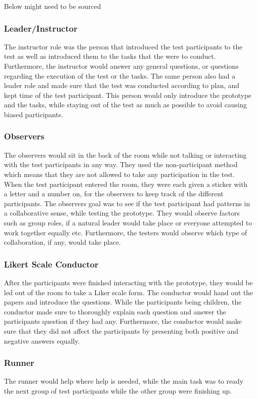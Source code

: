 Below might need to be sourced

\subsubsection*{Leader/Instructor}
The instructor role was the person that introduced the test participants to the test as well as introduced them to the tasks that the were to conduct. Furthermore, the instructor would answer any general questions, or questions regarding the execution of the test or the tasks. The same person also had a leader role and made sure that the test was conducted according to plan, and kept time of the test participant. This person would only introduce the prototype and the tasks, while staying out of the test as much as possible to avoid causing biased participants.

\subsubsection*{Observers}
The observers would sit in the back of the room while not talking or interacting with the test participants in any way. They used the non-participant method which means that they are not allowed to take any participation in the test. When the test participant entered the room, they were each given a sticker with a letter and a number on, for the observers to keep track of the different participants. The observers goal was to see if the test participant had patterns in a collaborative sense, while testing the prototype. They would observe factors such as group roles, if a natural leader would take place or everyone attempted to work together equally etc. Furthermore, the testers would observe which type of collaboration, if any, would take place. 

\subsubsection*{Likert Scale Conductor}
After the participants were finished interacting with the prototype, they would be led out of the room to take a Liker scale form. The conductor would hand out the papers and introduce the questions. While the participants being children, the conductor made sure to thoroughly explain each question and answer the participants question if they had any. Furthermore, the conductor would make sure that they did not affect the participants by presenting both positive and negative answers equally.

\subsubsection*{Runner}
The runner would help where help is needed, while the main task was to ready the next group of test participants while the other group were finishing up.


